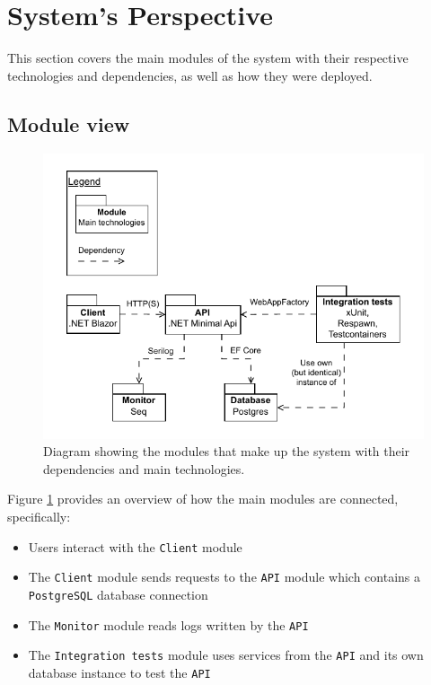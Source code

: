 \section{System's Perspective}
\label{ch:sys_persp} %

This section covers the main modules of the system with their  
respective technologies and dependencies, as well as how they
were deployed.

\subsection{Module view}

\begin{figure}[H]
    \centering
    \includegraphics[width=\linewidth]{images/modules.drawio.pdf}
    \caption{Diagram showing the modules that make up the system with
    their dependencies and main technologies.}
    \label{fig:modules}
\end{figure}

Figure \ref{fig:modules} provides an overview of how the main modules are connected, specifically:
\begin{itemize}
    \item Users interact with the \texttt{Client} module
    \item The \texttt{Client} module sends requests to the \texttt{API} module which contains a \texttt{PostgreSQL} database connection
    \item The \texttt{Monitor} module reads logs written by the \texttt{API}
    \item The \texttt{Integration tests} module uses services from the \texttt{API} and its own database instance to test the \texttt{API}
\end{itemize}

